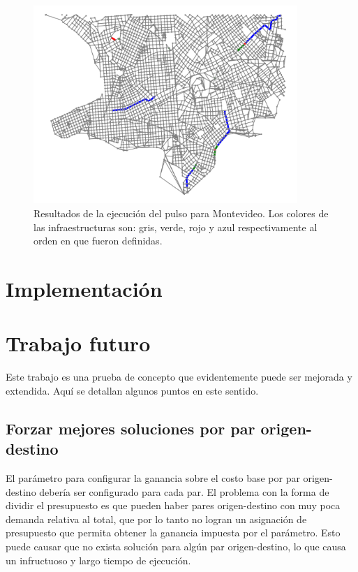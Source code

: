 \documentclass{article}
\begin{document}
  \begin{figure}[h!]
    \centering
    \includegraphics[width=10cm]{imgs/mdeo_large_pulse.png}
    \caption{Resultados de la ejecución del pulso para Montevideo. Los colores de las infraestructuras son: gris, verde, rojo y azul respectivamente al orden en que fueron definidas.}
    \label{resultadosmontevideo}
  \end{figure}

  \section*{Implementación}

  \section*{Trabajo futuro}

  Este trabajo es una prueba de concepto que evidentemente puede ser mejorada y extendida. Aquí se detallan algunos puntos en este sentido.

  \subsection*{Forzar mejores soluciones por par origen-destino}

  El parámetro para configurar la ganancia sobre el costo base por par origen-destino debería ser configurado para cada par. El problema con la forma de dividir el presupuesto es que pueden haber pares origen-destino con muy poca demanda relativa al total, que por lo tanto no logran un asignación de presupuesto que permita obtener la ganancia impuesta por el parámetro. Esto puede causar que no exista solución para algún par origen-destino, lo que causa un infructuoso y largo tiempo de ejecución.
\end{document}

